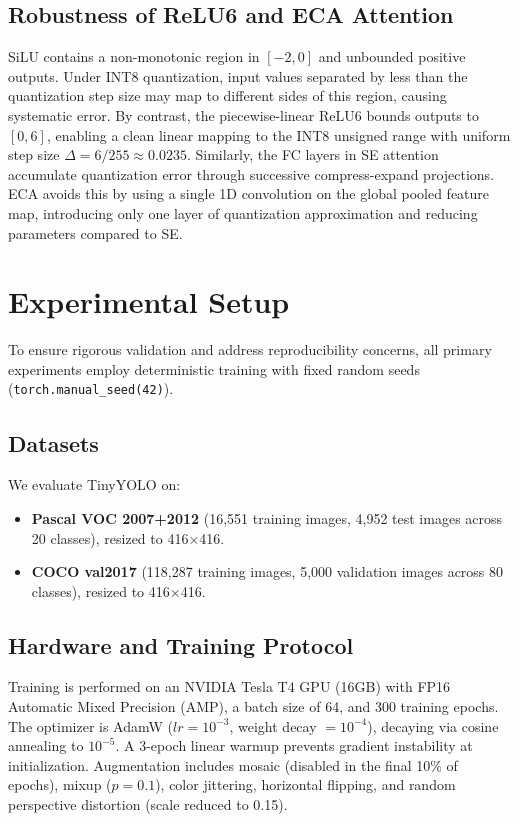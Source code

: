 \documentclass[conference]{IEEEtran}
\begin{document}
\subsection{Robustness of ReLU6 and ECA Attention}
SiLU contains a non-monotonic region in $[-2, 0]$ and unbounded positive outputs. Under INT8 quantization, input values separated by less than the quantization step size may map to different sides of this region, causing systematic error. By contrast, the piecewise-linear ReLU6 bounds outputs to $[0, 6]$, enabling a clean linear mapping to the INT8 unsigned range with uniform step size $\Delta = 6/255 \approx 0.0235$. Similarly, the FC layers in SE attention accumulate quantization error through successive compress-expand projections. ECA avoids this by using a single 1D convolution on the global pooled feature map, introducing only one layer of quantization approximation and reducing parameters compared to SE.

\section{Experimental Setup}
To ensure rigorous validation and address reproducibility concerns, all primary experiments employ deterministic training with fixed random seeds (\texttt{torch.manual\_seed(42)}).

\subsection{Datasets}
We evaluate TinyYOLO on:
\begin{itemize}
\item \textbf{Pascal VOC 2007+2012} (16,551 training images, 4,952 test images across 20 classes), resized to 416$\times$416.
\item \textbf{COCO val2017} (118,287 training images, 5,000 validation images across 80 classes), resized to 416$\times$416.
\end{itemize}

\subsection{Hardware and Training Protocol}
Training is performed on an NVIDIA Tesla T4 GPU (16GB) with FP16 Automatic Mixed Precision (AMP), a batch size of 64, and 300 training epochs. The optimizer is AdamW ($lr=10^{-3}$, weight decay $=10^{-4}$), decaying via cosine annealing to $10^{-5}$. A 3-epoch linear warmup prevents gradient instability at initialization. Augmentation includes mosaic (disabled in the final 10\% of epochs), mixup ($p=0.1$), color jittering, horizontal flipping, and random perspective distortion (scale reduced to 0.15).
\end{document}

